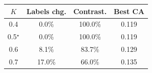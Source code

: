 \begin{tabular}{cccc}
\toprule
$K$ & Labels chg. & Contrast. & Best CA \\
\midrule
0.4 & 0.0\% & 100.0\% & 0.119 \\
0.5$^{\star}$ & 0.0\% & 100.0\% & 0.119 \\
0.6 & 8.1\% & 83.7\% & 0.129 \\
0.7 & 17.0\% & 66.0\% & 0.135 \\
\bottomrule
\end{tabular}
